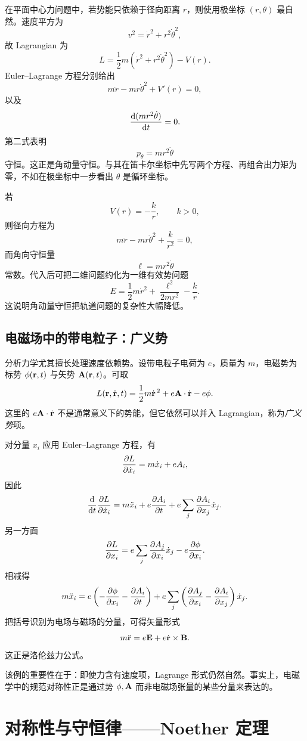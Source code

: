 在平面中心力问题中，若势能只依赖于径向距离 $r$，则使用极坐标 $(r,\theta)$ 最自然。速度平方为
\[
  v^2=\dot r^2+r^2\dot\theta^2,
\]
故 Lagrangian 为
\[
  L=\frac12 m\left(\dot r^2+r^2\dot\theta^2\right)-V(r).
\]
Euler--Lagrange 方程分别给出
\[
  m\ddot r-mr\dot\theta^2+V'(r)=0,
\]
以及
\[
  \dv{(mr^2\dot\theta)}{t}=0.
\]
第二式表明
\[
  p_\theta=mr^2\dot\theta
\]
守恒。这正是角动量守恒。与其在笛卡尔坐标中先写两个方程、再组合出力矩为零，不如在极坐标中一步看出 $\theta$ 是循环坐标。

\begin{example}[开普勒势]
若
\[
  V(r)=-\frac{k}{r},\qquad k>0,
\]
则径向方程为
\[
  m\ddot r-mr\dot\theta^2+\frac{k}{r^2}=0,
\]
而角向守恒量
\[
  \ell =mr^2\dot\theta
\]
常数。代入后可把二维问题约化为一维有效势问题
\[
  E=\frac12 m\dot r^2+\frac{\ell^2}{2mr^2}-\frac{k}{r}.
\]
这说明角动量守恒把轨道问题的复杂性大幅降低。
\end{example}

\subsection{电磁场中的带电粒子：广义势}

分析力学尤其擅长处理速度依赖势。设带电粒子电荷为 $e$，质量为 $m$，电磁势为标势 $\phi(\vb r,t)$ 与矢势 $\vb A(\vb r,t)$。可取
\[
  L(\vb r,\dot{\vb r},t)=\frac12 m\dot{\vb r}^{\,2}+e\vb A\cdot \dot{\vb r}-e\phi.
\]
这里的 $e\vb A\cdot\dot{\vb r}$ 不是通常意义下的势能，但它依然可以并入 Lagrangian，称为\emph{广义势}项。

\begin{example}
对分量 $x_i$ 应用 Euler--Lagrange 方程，有
\[
  \pdv{L}{\dot x_i}=m\dot x_i+eA_i,
\]
因此
\[
  \dv{}{t}\pdv{L}{\dot x_i}=m\ddot x_i+e\pdv{A_i}{t}+e\sum_j \pdv{A_i}{x_j}\dot x_j.
\]
另一方面
\[
  \pdv{L}{x_i}=e\sum_j \pdv{A_j}{x_i}\dot x_j-e\pdv{\phi}{x_i}.
\]
相减得
\[
  m\ddot x_i = e\left(-\pdv{\phi}{x_i}-\pdv{A_i}{t}\right)
  +e\sum_j\left(\pdv{A_j}{x_i}-\pdv{A_i}{x_j}\right)\dot x_j.
\]
把括号识别为电场与磁场的分量，可得矢量形式
\[
  m\ddot{\vb r}=e\vb E+e\dot{\vb r}\times \vb B.
\]
这正是洛伦兹力公式。
\end{example}

\begin{remark}
该例的重要性在于：即使力含有速度项，Lagrange 形式仍然自然。事实上，电磁学中的规范对称性正是通过势 $\phi,\vb A$ 而非电磁场张量的某些分量来表达的。
\end{remark}

\section{对称性与守恒律——Noether 定理}

